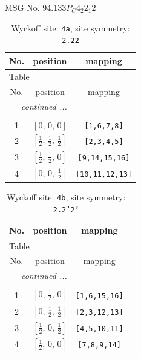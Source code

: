 \documentclass[fleqn,8pt]{jsarticle}
\begin{document}
\setcounter{MaxMatrixCols}{32}

\renewcommand{\tablename}{Table~}
\renewcommand{\figurename}{Figure~}
\begin{center}
\LARGE
MSG No. 94.133\quad$P_{C}4_{2}2_{1}2$
\end{center}
\renewcommand{\arraystretch}{1.2}
\begin{longtable}{ccc}
\caption{Wyckoff site: {\tt 4a}, site symmetry: {\tt 2.22}}
 \\
 \hline \hline
No. & position & mapping \\ \hline \endfirsthead

\multicolumn{2}{l}{\tablename\ \thetable{}} \\
 \hline \hline
No. & position & mapping \\ \hline \endhead

 \hline \hline
\multicolumn{2}{r}{\footnotesize\it continued ...} \\ \endfoot

 \hline \hline
\multicolumn{2}{r}{} \\ \endlastfoot

1 & $\left[ 0,\, 0,\, 0 \right]$ & {\tt [1,6,7,8]} \\ \hline
2 & $\left[ \frac{1}{2},\, \frac{1}{2},\, \frac{1}{2} \right]$ & {\tt [2,3,4,5]} \\ \hline
3 & $\left[ \frac{1}{2},\, \frac{1}{2},\, 0 \right]$ & {\tt [9,14,15,16]} \\ \hline
4 & $\left[ 0,\, 0,\, \frac{1}{2} \right]$ & {\tt [10,11,12,13]} \\
\end{longtable}
\renewcommand{\arraystretch}{1.2}
\begin{longtable}{ccc}
\caption{Wyckoff site: {\tt 4b}, site symmetry: {\tt 2.2'2'}}
 \\
 \hline \hline
No. & position & mapping \\ \hline \endfirsthead

\multicolumn{2}{l}{\tablename\ \thetable{}} \\
 \hline \hline
No. & position & mapping \\ \hline \endhead

 \hline \hline
\multicolumn{2}{r}{\footnotesize\it continued ...} \\ \endfoot

 \hline \hline
\multicolumn{2}{r}{} \\ \endlastfoot

1 & $\left[ 0,\, \frac{1}{2},\, 0 \right]$ & {\tt [1,6,15,16]} \\ \hline
2 & $\left[ 0,\, \frac{1}{2},\, \frac{1}{2} \right]$ & {\tt [2,3,12,13]} \\ \hline
3 & $\left[ \frac{1}{2},\, 0,\, \frac{1}{2} \right]$ & {\tt [4,5,10,11]} \\ \hline
4 & $\left[ \frac{1}{2},\, 0,\, 0 \right]$ & {\tt [7,8,9,14]} \\
\end{longtable}
\end{document}
